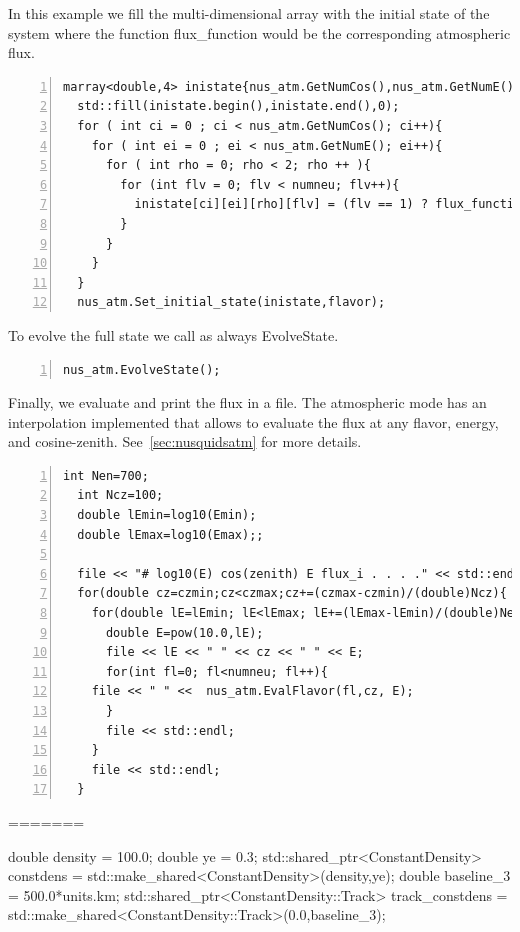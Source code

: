 \documentclass[3p,12pt]{elsarticle}
\newcommand{\ttf}{\ttfamily}
\begin{document}
In this example we fill the multi-dimensional array with the initial state of the
system where the function {\ttf flux\_function} would be the corresponding
atmospheric flux.

\begin{lstlisting}[frame=leftline, numbers =
  left,breaklines=true,label = ex:sin1,firstnumber=last]
  marray<double,4> inistate{nus_atm.GetNumCos(),nus_atm.GetNumE(),2,numneu};
  std::fill(inistate.begin(),inistate.end(),0);
  for ( int ci = 0 ; ci < nus_atm.GetNumCos(); ci++){
    for ( int ei = 0 ; ei < nus_atm.GetNumE(); ei++){
      for ( int rho = 0; rho < 2; rho ++ ){
        for (int flv = 0; flv < numneu; flv++){
          inistate[ci][ei][rho][flv] = (flv == 1) ? flux_function(e_range[ei], cz_range[ci]) : 0.0;//set 1 only to the muon flavor
        }
      }
    }
  }
  nus_atm.Set_initial_state(inistate,flavor);
\end{lstlisting}

To evolve the full state we call as always {\ttf EvolveState}. 

\begin{lstlisting}[frame=leftline, numbers =
  left,breaklines=true,label = ex:sin1,firstnumber=last]
nus_atm.EvolveState();
\end{lstlisting}

Finally, we evaluate and print the flux in a file. The
atmospheric mode has an interpolation implemented that allows to
evaluate the flux at any flavor, energy, and cosine-zenith. See~\ref{sec:nusquidsatm}
for more details.

\begin{lstlisting}[frame=leftline, numbers =
  left,breaklines=true,label = ex:sin1,firstnumber=last]
  int Nen=700;
  int Ncz=100;
  double lEmin=log10(Emin);
  double lEmax=log10(Emax);;

  file << "# log10(E) cos(zenith) E flux_i . . . ." << std::endl;
  for(double cz=czmin;cz<czmax;cz+=(czmax-czmin)/(double)Ncz){
    for(double lE=lEmin; lE<lEmax; lE+=(lEmax-lEmin)/(double)Nen){
      double E=pow(10.0,lE);
      file << lE << " " << cz << " " << E;
      for(int fl=0; fl<numneu; fl++){
	file << " " <<  nus_atm.EvalFlavor(fl,cz, E);
      }
      file << std::endl;
    }
    file << std::endl;
  }
\end{lstlisting}


=======

  double density = 100.0;
  double ye = 0.3;
  std::shared_ptr<ConstantDensity> constdens = std::make_shared<ConstantDensity>(density,ye);
  double baseline_3 = 500.0*units.km;
  std::shared_ptr<ConstantDensity::Track> track_constdens =   std::make_shared<ConstantDensity::Track>(0.0,baseline_3);
\end{document}
